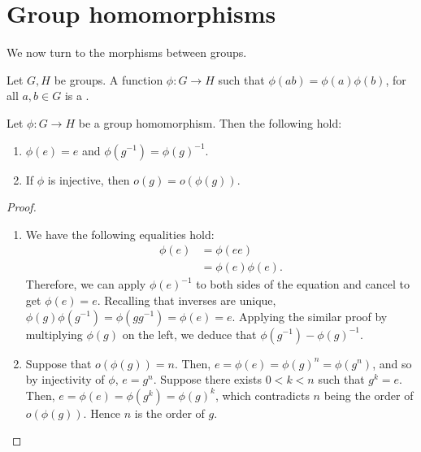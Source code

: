\documentclass[12pt]{report}
\begin{document}
\section{Group homomorphisms}
\label{sec:group-theory:group-homomorphisms}

We now turn to the morphisms between groups.

\begin{definition}
  \label{def:group-theory:group-homomorphism}
  Let \(G, H\) be groups.
  A function \(\phi : G \to H\) such that \(\phi(ab) = \phi(a) \phi(b)\), for all \(a, b \in G\) is a .
\end{definition}

\begin{lemma}
  Let \(\phi : G \to H\) be a group homomorphism.
  Then the following hold:
  \begin{enumerate}
  \item
    \(\phi(e) = e\) and \(\phi(g^{-1}) = \phi(g) ^{-1}\).
  \item
    If \(\phi\) is injective, then \(o(g) = o\left(\phi(g)\right)\).
  \end{enumerate}
\end{lemma}

\begin{proof}
  \begin{enumerate}
  \item
    We have the following equalities hold:
    \begin{align*}
      \phi(e) &= \phi(ee) \\
              &= \phi(e) \phi(e).
    \end{align*}
    Therefore, we can apply \(\phi(e)^{-1}\) to both sides of the equation and cancel to get \(\phi(e) = e\).
    Recalling that inverses are unique, \(\phi(g)\phi(g^{-1}) = \phi(gg^{-1}) = \phi(e) = e\).
    Applying the similar proof by multiplying \(\phi(g)\) on the left, we deduce that \(\phi(g^{-1}) - \phi(g)^{-1}\).

  \item
    Suppose that \(o(\phi(g)) = n\).
    Then, \(e = \phi(e) = \phi(g)^{n} = \phi(g^{n})\), and so by injectivity of \(\phi\), \(e = g^{n}\).
    Suppose there exists \(0 < k < n\) such that \(g^{k} = e\). Then, \(e = \phi(e) = \phi(g^{k}) = \phi(g)^{k}\), which contradicts \(n\) being the order of \(o(\phi(g))\). Hence \(n\) is the order of \(g\).

  \end{enumerate}
\end{proof}
\end{document}

